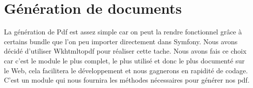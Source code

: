 \section{Génération de documents}
La génération de Pdf est assez simple car on peut la rendre fonctionnel grâce à certains bundle que l’on peu importer directement dans Symfony.
Nous avons décidé d’utiliser Wkhtmltopdf pour réaliser cette tache.
Nous avons fais ce choix car c’est le module le plus complet, le plus utilisé et donc le plus documenté sur le Web, cela facilitera le développement et nous gagnerons en rapidité de codage.
C’est un module qui nous fournira les méthodes nécessaires pour générer nos pdf.
